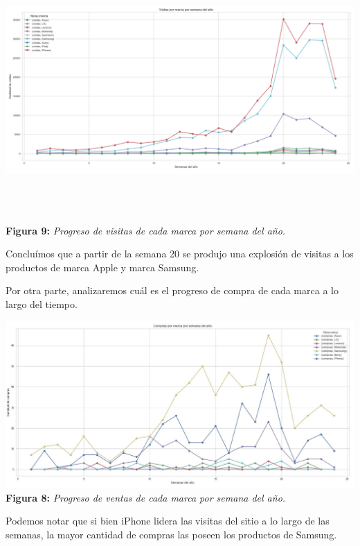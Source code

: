 \documentclass[titlepage,a4paper]{article}
\begin{document}
	\begin{center}
	\includegraphics[width=15cm,height = 10cm] {visitasPorSemanaDelAnioPorMarca.jpg}\\
	\textbf{Figura 9:}  \textit{Progreso de visitas de cada marca por semana del año. }
	\end{center}	
	Concluímos que a partir de la semana 20 se produjo una explosión de visitas a los productos de marca  Apple y marca Samsung. 
	
	Por otra parte, analizaremos cuál es el progreso de compra de cada marca a lo largo del tiempo.	
	
		\begin{center}
	\includegraphics[width=15cm] {comprasPorMarcaPorSemanaDelAno.jpg}\\
	\textbf{Figura 8:}  \textit{Progreso de ventas de cada marca por semana del año. }
	\end{center}
	
	Podemos notar que si bien iPhone lidera las visitas del sitio a lo largo de las semanas, la mayor cantidad de compras las poseen los productos de Samsung.	
	
\end{document}
